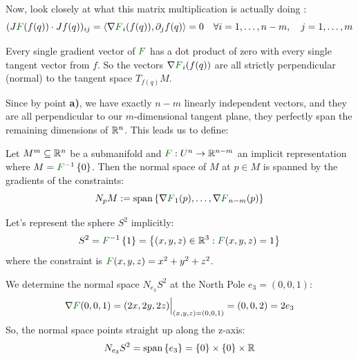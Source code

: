 Now, look closely at what this matrix multiplication is actually doing \warning{(!!!)}:
\[ (J\textcolor{eDarkGreen}{F}(f(q)) \cdot Jf(q))_{ij} = \langle \nabla \textcolor{eDarkGreen}{F}_i(f(q)), \partial_j f(q) \rangle = 0 \quad \forall i=1,\dots,n-m, \quad j=1,\dots,m \]

Every single gradient vector of $\textcolor{eDarkGreen}{F}$ has a dot product of zero with every single tangent vector from $f$. So the vectors $\nabla \textcolor{eDarkGreen}{F}_i(f(q))$ are all strictly perpendicular (normal) to the tangent space $T_{f(q)} M$. 

Since by point \textbf{a)}, we have exactly $n-m$ linearly independent vectors, and they are all perpendicular to our $m$-dimensional tangent plane, they perfectly span the remaining dimensions of $\mathbb{R}^n$. This leads us to define:

\begin{definition*}
Let $M^m \subseteq \mathbb{R}^n$ be a submanifold and $\textcolor{eDarkGreen}{F}: U^n \to \R^{n-m}$ an implicit representation where $M = \textcolor{eDarkGreen}{F}^{-1}\set{0}$.
Then the normal space of $M$ at $p \in M$ is spanned by the gradients of the constraints:
\[ N_p M := \Span\set{\nabla \textcolor{eDarkGreen}{F}_1(p), \dots, \nabla \textcolor{eDarkGreen}{F}_{n-m}(p)} \]
\end{definition*}

\begin{example*}
Let's represent the sphere $S^2$ implicitly:
\[ S^2 = \textcolor{eDarkGreen}{F}^{-1}\set{1} = \set{(x,y,z) \in \R^3 : \textcolor{eDarkGreen}{F}(x,y,z) = 1} \]
where the constraint is $\textcolor{eDarkGreen}{F}(x,y,z) = x^2 + y^2 + z^2$.

We determine the normal space $N_{e_3} S^2$ at the North Pole $e_3 = (0,0,1)$:
\[ \nabla \textcolor{eDarkGreen}{F}(0,0,1) = (2x, 2y, 2z) \Big|_{(x,y,z)=(0,0,1)} = (0,0,2) = 2e_3 \]
So, the normal space points straight up along the z-axis:
\[ N_{e_3} S^2 = \operatorname{span}\left\{ e_3 \right\} = \left\{ 0 \right\} \times \left\{ 0 \right\} \times \mathbb{R} \]

\begin{center}
\end{center}
\end{example*}
